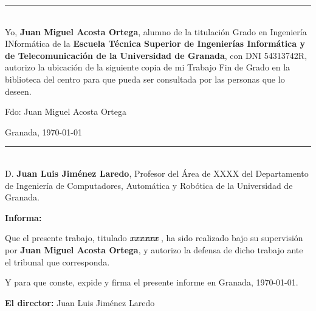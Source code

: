\newpage \thispagestyle{empty} \mbox{} \newpage
\vspace{5cm}
\noindent\rule[-1ex]{\textwidth}{2pt}\\[4.5ex]

Yo, \textbf{Juan Miguel Acosta Ortega}, alumno de la titulación Grado en Ingeniería INformática de la \textbf{Escuela Técnica Superior
de Ingenierías Informática y de Telecomunicación de la Universidad de Granada}, con DNI 54313742R, autorizo la ubicación de la siguiente copia de mi Trabajo Fin de Grado en la biblioteca del centro para que pueda ser
consultada por las personas que lo deseen.

\vspace{6cm}

\noindent Fdo: Juan Miguel Acosta Ortega

\vspace{2cm}

\begin{flushright}
Granada, \today
\end{flushright}

\newpage \thispagestyle{empty} \mbox{} \newpage

\newpage
\vspace{5cm}
\noindent\rule[-1ex]{\textwidth}{2pt}\\[4.5ex]

D. \textbf{Juan Luis Jiménez Laredo}, Profesor del Área de XXXX
del Departamento de Ingeniería de Computadores, Automática y Robótica de la Universidad de Granada.

\vspace{0.5cm}

\textbf{Informa:}

\vspace{0.5cm}

Que el presente trabajo, titulado \textit{\textbf{ xxxxxx }}, ha sido realizado bajo su supervisión por \textbf{Juan Miguel Acosta Ortega}, y autorizo la defensa de dicho trabajo ante el tribunal que corresponda.

\vspace{0.5cm}

Y para que conste, expide y firma el presente informe en Granada, \today.

\vspace{1cm}

\textbf{El director:} Juan Luis Jiménez Laredo

\newpage \thispagestyle{empty} \mbox{} \newpage